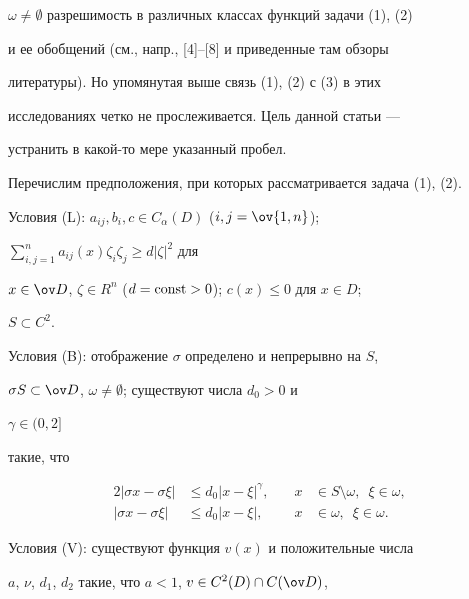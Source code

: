 $\omega\ne\emptyset$ разрешимость в различных классах функций задачи (1), (2) 


и ее обобщений (см., напр., [4]--[8] и приведенные там обзоры 


литературы). Но упомянутая выше связь (1), (2) с (3) в этих 


исследованиях четко не прослеживается. Цель данной статьи --- 


устранить в какой-то мере указанный пробел. 


 


Перечислим предположения, при которых рассматривается задача (1), (2). 


\medskip 


 


Условия (L): $a_{ij},b_i,c\in C_\alpha(D)$ ($i,j=\ov{1,n}$); 


$\sum\limits^n_{i,j=1}a_{ij}(x)\zeta_i\zeta_j\ge d|\zeta|^2$ для 


$x\in\ov D$, $\zeta\in R^n$ ($d=\operatorname{const}>0$); $c(x)\le0$ для $x\in D$; 


$S\subset C^2$. 


\medskip 


 


Условия (B): отображение $\sigma$ определено и непрерывно на $S$, 


$\sigma S\subset\ov D$, $\omega\ne\emptyset$; существуют числа $d_0>0$ и 


$\gamma\in(0,2]$ 


такие, что 


\begin{alignat}{2} 


|\sigma x-\sigma\xi|&\le d_0|x-\xi|^\gamma, &\quad 


x&\in S\setminus\omega,\ \; \xi\in\omega,\\ 


% 


|\sigma x-\sigma\xi|&\le d_0|x-\xi|, &\quad 


x&\in\omega,\ \;\xi\in\omega. 


\end{alignat} 


 


Условия (V): существуют функция $v(x)$ и положительные числа 


$a$, $\nu$, $d_1$, $d_2$ такие, что $a<1$, $v\in C^2(D)\cap C(\ov D)$, 


